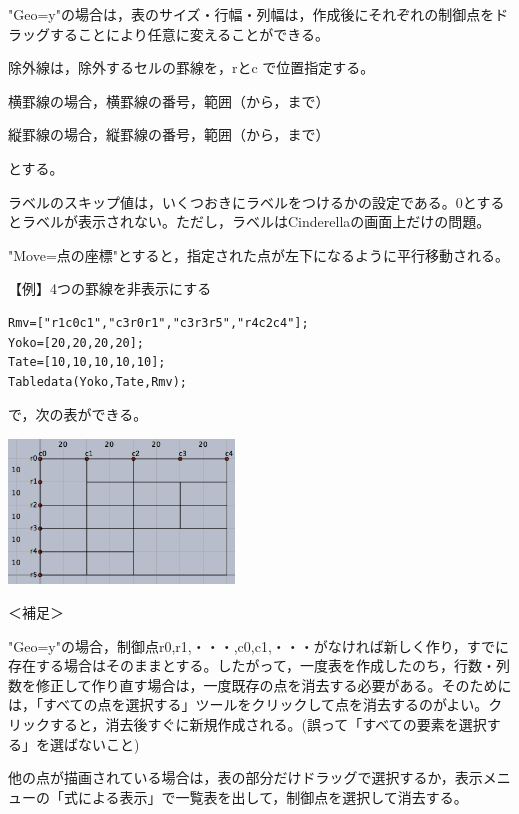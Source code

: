 \documentclass[papersize,a4paper,10pt,uplatex]{jsarticle}
\begin{document}
\begin{description}
"Geo=y"の場合は，表のサイズ・行幅・列幅は，作成後にそれぞれの制御点をドラッグすることにより任意に変えることができる。

\vspace{\baselineskip}
除外線は，除外するセルの罫線を，rとc で位置指定する。

\hspace{10mm} 横罫線の場合，横罫線の番号，範囲（から，まで）

\hspace{10mm} 縦罫線の場合，縦罫線の番号，範囲（から，まで）

とする。

ラベルのスキップ値は，いくつおきにラベルをつけるかの設定である。0とするとラベルが表示されない。ただし，ラベルはCinderellaの画面上だけの問題。

\vspace{\baselineskip}"Move=点の座標"とすると，指定された点が左下になるように平行移動される。


\vspace{\baselineskip}
【例】4つの罫線を非表示にする
\begin{verbatim}
Rmv=["r1c0c1","c3r0r1","c3r3r5","r4c2c4"];
Yoko=[20,20,20,20];
Tate=[10,10,10,10,10];
Tabledata(Yoko,Tate,Rmv);
\end{verbatim}

で，次の表ができる。

\vspace{\baselineskip}
\hspace{20mm}\includegraphics[bb=0 0 392.02 251.51 , width=6cm]{Fig/table03.pdf}

\vspace{\baselineskip}
＜補足＞

"Geo=y"の場合，制御点r0,r1,・・・,c0,c1,・・・がなければ新しく作り，すでに存在する場合はそのままとする。したがって，一度表を作成したのち，行数・列数を修正して作り直す場合は，一度既存の点を消去する必要がある。そのためには，「すべての点を選択する」ツールをクリックして点を消去するのがよい。クリックすると，消去後すぐに新規作成される。(誤って「すべての要素を選択する」を選ばないこと)

他の点が描画されている場合は，表の部分だけドラッグで選択するか，表示メニューの「式による表示」で一覧表を出して，制御点を選択して消去する。


\end{description}
\end{document}
